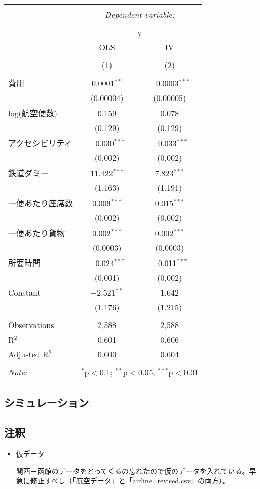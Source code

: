 \documentclass{jsarticle}
\begin{document}
\begin{table}[!htbp] \centering 
  \caption{} 
  \label{} 
\begin{tabular}{@{\extracolsep{5pt}}lcc} 
\\[-1.8ex]\hline 
\hline \\[-1.8ex] 
 & \multicolumn{2}{c}{\textit{Dependent variable:}} \\ 
\cline{2-3} 
\\[-1.8ex] & \multicolumn{2}{c}{y} \\ 
 & OLS & IV \\ 
\\[-1.8ex] & (1) & (2)\\ 
\hline \\[-1.8ex] 
 費用 & 0.0001$^{**}$ & $-$0.0003$^{***}$ \\ 
  & (0.00004) & (0.00005) \\ 
  log(航空便数) & 0.159 & 0.078 \\ 
  & (0.129) & (0.129) \\ 
  アクセシビリティ & $-$0.030$^{***}$ & $-$0.033$^{***}$ \\ 
  & (0.002) & (0.002) \\ 
  鉄道ダミー & 11.422$^{***}$ & 7.823$^{***}$ \\ 
  & (1.163) & (1.191) \\ 
  一便あたり座席数 & 0.009$^{***}$ & 0.015$^{***}$ \\ 
  & (0.002) & (0.002) \\ 
  一便あたり貨物 & 0.002$^{***}$ & 0.002$^{***}$ \\ 
  & (0.0003) & (0.0003) \\ 
  所要時間 & $-$0.024$^{***}$ & $-$0.011$^{***}$ \\ 
  & (0.001) & (0.002) \\ 
  Constant & $-$2.521$^{**}$ & 1.642 \\ 
  & (1.176) & (1.215) \\ 
 \hline \\[-1.8ex] 
Observations & 2,588 & 2,588 \\ 
R$^{2}$ & 0.601 & 0.606 \\ 
Adjusted R$^{2}$ & 0.600 & 0.604 \\ 
\hline 
\hline \\[-1.8ex] 
\textit{Note:}  & \multicolumn{2}{r}{$^{*}$p$<$0.1; $^{**}$p$<$0.05; $^{***}$p$<$0.01} \\ 
\end{tabular} 
\end{table}

\subsection{シミュレーション}

\subsection{注釈}
\begin{itemize} %

\item 仮データ

関西－函館のデータをとってくるの忘れたので仮のデータを入れている。早急に修正すべし（「航空データ」と「airline_revised.csv」の両方）。

\end{itemize}
\end{document}
